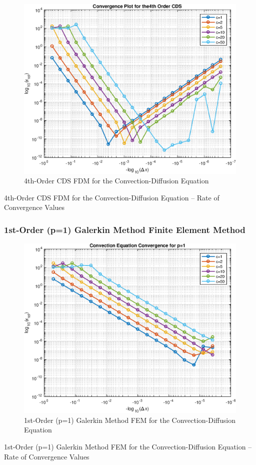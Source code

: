 \documentclass[10pt]{article}		%
\numberwithin{equation}{section}
\begin{document}
\begin{figure}[H]
	\begin{center}
		\includegraphics[width = 0.5\linewidth]{convergence_4th_order_cds}
		\caption{4th-Order CDS FDM for the Convection-Diffusion Equation}	
	\end{center}
\end{figure}

\begin{table}[H]
	
	\caption{4th-Order CDS FDM for the Convection-Diffusion Equation -- Rate of Convergence Values}	
\end{table}

\newpage

\subsubsection{1st-Order (p=1) Galerkin Method Finite Element Method}

\begin{figure}[H]
	\begin{center}
		\includegraphics[width = 0.5\linewidth]{convergence_convection_p_1}
		\caption{1st-Order (p=1) Galerkin Method FEM for the Convection-Diffusion Equation}	
	\end{center}
\end{figure}

\begin{table}[H]
	
	\caption{1st-Order (p=1) Galerkin Method FEM for the Convection-Diffusion Equation -- Rate of Convergence Values}	
\end{table}
\end{document}
